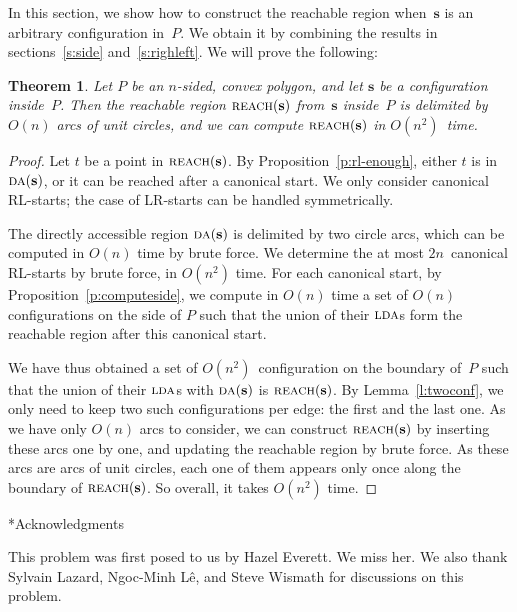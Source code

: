 \documentclass[a4paper]{article}
\makeatletter
\newcommand{\vecs}{{\mathbf{s}}}
\DeclareMathOperator{\reach}{\textsc{reach}}
\DeclareMathOperator{\DA}{\textsc{da}}
\DeclareMathOperator{\LDA}{\textsc{lda}}
\newtheorem{theorem}{Theorem}
\def\section{\@startsection {section}{1}{\z@}{-3.5ex plus -1ex minus
-.2ex}{2.3ex plus .2ex}{\large\bf}}
\makeatother
\begin{document}
In this section, we show how to construct the reachable region
when~$\vecs$ is an arbitrary configuration in~$P$. We obtain it by
combining the results in sections~\ref{s:side} and~\ref{s:righleft}.
We will prove the following:
\begin{theorem}\label{th:main}
  Let $P$ be an $n$-sided, convex polygon, and let $\vecs$ be a
  configuration inside~$P$. Then the reachable region $\reach(\vecs)$
  from~$\vecs$ inside~$P$ is delimited by $O(n)$ arcs of unit circles,
  and we can compute $\reach(\vecs)$ in $O(n^2)$~time.
\end{theorem}
\begin{proof}
  Let $t$ be a point in $\reach(\vecs)$. By
  Proposition~\ref{p:rl-enough}, either $t$ is in $\DA(\vecs)$, or it
  can be reached after a canonical start.  We only consider canonical
  RL-starts; the case of LR-starts can be handled symmetrically.

  The directly accessible region $\DA(\vecs)$ is delimited by two
  circle arcs, which can be computed in $O(n)$ time by brute force. We
  determine the at most $2n$~canonical RL-starts by brute force, in
  $O(n^2)$ time. For each canonical start, by
  Proposition~\ref{p:computeside}, we compute in $O(n)$ time a set of
  $O(n)$ configurations on the side of $P$ such that the union of
  their $\LDA$s form the reachable region after this canonical start.

  We have thus obtained a set of $O(n^2)$~configuration on the
  boundary of~$P$ such that the union of their $\LDA$s with
  $\DA(\vecs)$ is $\reach(\vecs)$.  By Lemma~\ref{l:twoconf}, we only
  need to keep two such configurations per edge: the first and the
  last one. As we have only $O(n)$ arcs to consider, we can construct
  $\reach(\vecs)$ by inserting these arcs one by one, and updating the
  reachable region by brute force.  As these arcs are arcs of unit
  circles, each one of them appears only once along the boundary of
  $\reach(\vecs)$. So overall, it takes $O(n^2)$ time.
\end{proof}

\section*{Acknowledgments}

This problem was first posed to us by Hazel Everett.  We miss her. We
also thank Sylvain Lazard, Ngoc-Minh L\^e, and Steve Wismath for
discussions on this problem.
\end{document}
